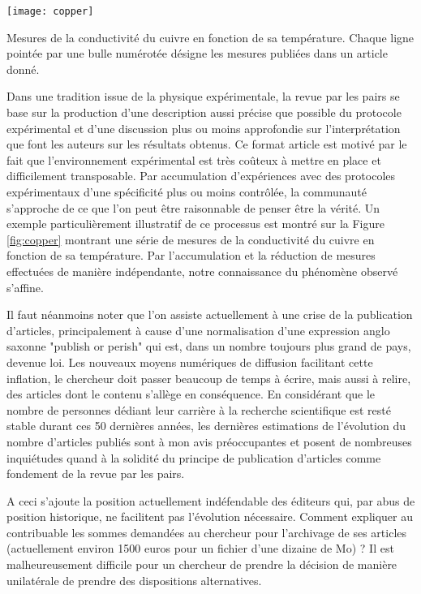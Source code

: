\begin{marginfigure}
  \texttt{[image: copper]}
  \caption{Mesures de la conductivité du cuivre en fonction de sa température. Chaque ligne pointée par une bulle numérotée désigne les mesures publiées dans un article donné.}
  \label{fig:copper}
\end{marginfigure}

Dans une tradition issue de la physique expérimentale, la revue par les pairs se base sur la production d'une description aussi précise que possible du protocole expérimental et d'une discussion plus ou moins approfondie sur l'interprétation que font les auteurs sur les résultats obtenus. Ce format \og article \fg est motivé par le fait que l'environnement expérimental est très coûteux à mettre en place et difficilement transposable. Par accumulation d'expériences avec des protocoles expérimentaux d'une spécificité plus ou moins contrôlée, la communauté s'approche de ce que l'on peut être raisonnable de penser être la vérité. Un exemple particulièrement illustratif de ce processus est montré sur la Figure \ref{fig:copper} montrant une série de mesures de la conductivité du cuivre en fonction de sa température. Par l'accumulation et la réduction de mesures effectuées de manière indépendante, notre connaissance du phénomène observé s'affine.

Il faut néanmoins noter que l'on assiste actuellement à une \og crise \fg de la publication d'articles, principalement à cause d'une normalisation d'une expression anglo saxonne "publish or perish" qui est, dans un nombre toujours plus grand de pays, devenue loi. Les nouveaux moyens numériques de diffusion facilitant cette inflation, le chercheur doit passer beaucoup de temps à écrire, mais aussi à relire, des articles dont le contenu s'allège en conséquence. En considérant que le nombre de personnes dédiant leur carrière à la recherche scientifique est resté stable durant ces 50 dernières années, les dernières estimations de l'évolution du nombre d'articles publiés sont à mon avis préoccupantes et posent de nombreuses inquiétudes quand à la solidité du principe de publication d'articles comme fondement de la revue par les pairs.~\cite{bornmann2015growth}

A ceci s'ajoute la position actuellement indéfendable des éditeurs qui, par abus de position historique, ne facilitent pas l'évolution nécessaire. Comment expliquer au contribuable les sommes demandées au chercheur pour l'archivage de ses articles (actuellement environ 1500 euros pour un fichier d'une dizaine de Mo) ? Il est malheureusement difficile pour un chercheur de prendre la décision de manière unilatérale de prendre des dispositions alternatives.

